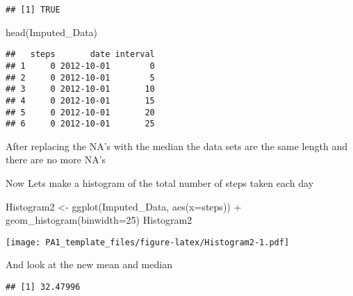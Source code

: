 \documentclass[
]{article}
\newenvironment{Shaded}{\begin{snugshade}}{\end{snugshade}}
\newcommand{\AttributeTok}[1]{\textcolor[rgb]{0.77,0.63,0.00}{#1}}
\newcommand{\ConstantTok}[1]{\textcolor[rgb]{0.00,0.00,0.00}{#1}}
\newcommand{\DecValTok}[1]{\textcolor[rgb]{0.00,0.00,0.81}{#1}}
\newcommand{\FunctionTok}[1]{\textcolor[rgb]{0.00,0.00,0.00}{#1}}
\newcommand{\NormalTok}[1]{#1}
\newcommand{\OtherTok}[1]{\textcolor[rgb]{0.56,0.35,0.01}{#1}}
\newcommand{\SpecialCharTok}[1]{\textcolor[rgb]{0.00,0.00,0.00}{#1}}
\begin{document}
\begin{verbatim}
## [1] TRUE
\end{verbatim}

\begin{Shaded}
\begin{Highlighting}[]
\FunctionTok{head}\NormalTok{(Imputed\_Data)}
\end{Highlighting}
\end{Shaded}

\begin{verbatim}
##   steps       date interval
## 1     0 2012-10-01        0
## 2     0 2012-10-01        5
## 3     0 2012-10-01       10
## 4     0 2012-10-01       15
## 5     0 2012-10-01       20
## 6     0 2012-10-01       25
\end{verbatim}

After replacing the NA's with the median the data sets are the same
length and there are no more NA's

Now Lets make a histogram of the total number of steps taken each day

\begin{Shaded}
\begin{Highlighting}[]
\NormalTok{Histogram2 }\OtherTok{\textless{}{-}} \FunctionTok{ggplot}\NormalTok{(Imputed\_Data, }\FunctionTok{aes}\NormalTok{(}\AttributeTok{x=}\NormalTok{steps)) }\SpecialCharTok{+}
  \FunctionTok{geom\_histogram}\NormalTok{(}\AttributeTok{binwidth=}\DecValTok{25}\NormalTok{)}
\NormalTok{Histogram2}
\end{Highlighting}
\end{Shaded}

\texttt{[image: PA1\_template\_files/figure-latex/Histogram2-1.pdf]}

And look at the new mean and median

\begin{Shaded}
\end{Shaded}

\begin{verbatim}
## [1] 32.47996
\end{verbatim}

\begin{Shaded}
\end{Shaded}
\end{document}
